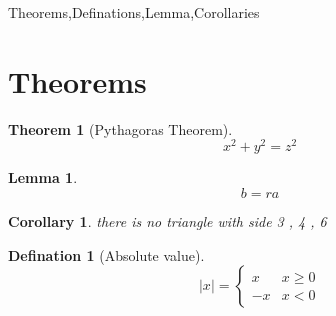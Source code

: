 \documentclass[12pt,a4paper]{article}
\newtheorem{theorem}{Theorem}[section]
\newtheorem{lemma}{Lemma}[theorem]
\newtheorem{corollary}{Corollary}[theorem]
\theoremstyle{defination}
\newtheorem{defination}{Defination}[section]
\begin{document}
\begin{center}
\LARGE \LARGE{Theorems,Definations,Lemma,Corollaries}
\end{center}
\section{Theorems}
\begin{theorem}[Pythagoras Theorem] \label {pyth}
\begin{equation}
x^2+y^2=z^2
\end{equation}
\end{theorem}
\begin{lemma}
\begin{equation}
b=ra
\end{equation}
\end{lemma}
\begin{corollary}
there is no triangle with side 3 , 4 , 6
\end{corollary}
\begin{defination}[Absolute value]
\begin{equation}
|x|= \begin {cases}   x & x \geq 0 \\ -x & x<0\end{cases}
\end{equation}
\end{defination}
\end{document}
